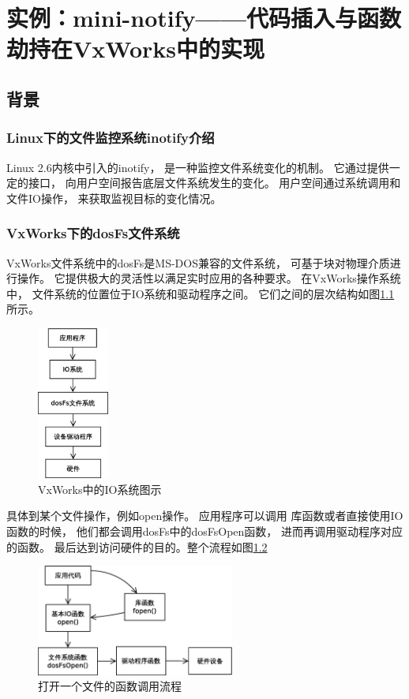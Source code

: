 \chapter{实例：mini-notify——代码插入与函数劫持在VxWorks中的实现}


\section{背景}

\subsection{Linux下的文件监控系统inotify介绍}

Linux 2.6内核中引入的inotify，
是一种监控文件系统变化的机制。
它通过提供一定的接口，
向用户空间报告底层文件系统发生的变化。
用户空间通过系统调用和文件IO操作，
来获取监视目标的变化情况。

\subsection{VxWorks下的dosFs文件系统}

VxWorks文件系统中的dosFs是MS-DOS兼容的文件系统，
可基于块对物理介质进行操作。
它提供极大的灵活性以满足实时应用的各种要求。
在VxWorks操作系统中，
文件系统的位置位于IO系统和驱动程序之间。
它们之间的层次结构如图\ref{iosys}所示。

\begin{figure}[h!]
    \centering
    \includegraphics[width=0.21\textwidth]{figure/IOsys.eps}
    \caption{VxWorks中的IO系统图示}
    \label{iosys}
\end{figure}

具体到某个文件操作，例如open操作。
应用程序可以调用
库函数或者直接使用IO函数的时候，
他们都会调用dosFs中的dosFsOpen函数，
进而再调用驱动程序对应的函数。
最后达到访问硬件的目的。整个流程如图\ref{open}

\begin{figure}[h!]
    \centering
\includegraphics[width=0.58\textwidth]{figure/open.eps}
    \caption{打开一个文件的函数调用流程}
    \label{open}
\end{figure}

